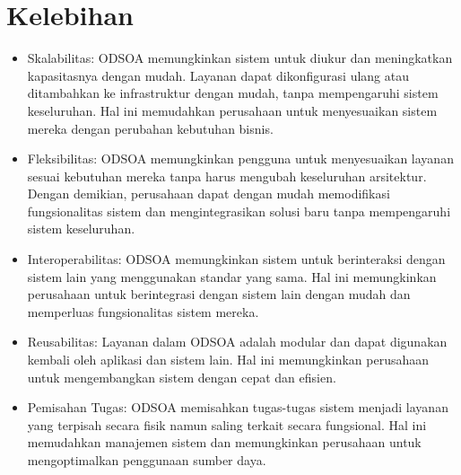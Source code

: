 \section{Kelebihan}
\begin{itemize}
\item Skalabilitas: ODSOA memungkinkan sistem untuk diukur dan meningkatkan kapasitasnya dengan mudah. Layanan dapat dikonfigurasi ulang atau ditambahkan ke infrastruktur dengan mudah, tanpa mempengaruhi sistem keseluruhan. Hal ini memudahkan perusahaan untuk menyesuaikan sistem mereka dengan perubahan kebutuhan bisnis.
\item Fleksibilitas: ODSOA memungkinkan pengguna untuk menyesuaikan layanan sesuai kebutuhan mereka tanpa harus mengubah keseluruhan arsitektur. Dengan demikian, perusahaan dapat dengan mudah memodifikasi fungsionalitas sistem dan mengintegrasikan solusi baru tanpa mempengaruhi sistem keseluruhan.
\item Interoperabilitas: ODSOA memungkinkan sistem untuk berinteraksi dengan sistem lain yang menggunakan standar yang sama. Hal ini memungkinkan perusahaan untuk berintegrasi dengan sistem lain dengan mudah dan memperluas fungsionalitas sistem mereka.
\item Reusabilitas: Layanan dalam ODSOA adalah modular dan dapat digunakan kembali oleh aplikasi dan sistem lain. Hal ini memungkinkan perusahaan untuk mengembangkan sistem dengan cepat dan efisien.
\item Pemisahan Tugas: ODSOA memisahkan tugas-tugas sistem menjadi layanan yang terpisah secara fisik namun saling terkait secara fungsional. Hal ini memudahkan manajemen sistem dan memungkinkan perusahaan untuk mengoptimalkan penggunaan sumber daya.
\end{itemize}

